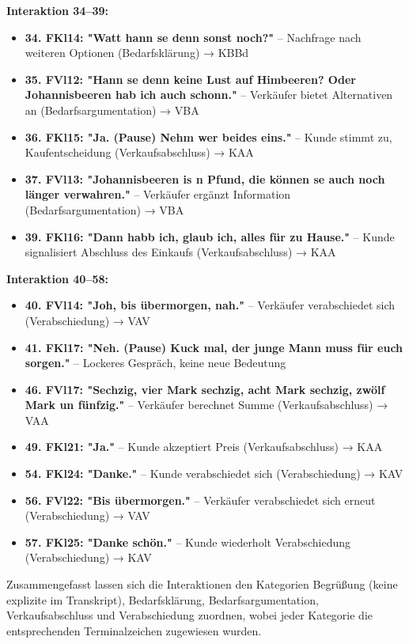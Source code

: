 \documentclass[
]{article}
\begin{document}
\textbf{Interaktion 34--39:}

\begin{itemize}
\item
  \textbf{34. FKl14: "Watt hann se denn sonst noch?"} -- Nachfrage nach weiteren Optionen (Bedarfsklärung) → KBBd
\item
  \textbf{35. FVl12: "Hann se denn keine Lust auf Himbeeren? Oder Johannisbeeren hab ich auch schonn."} -- Verkäufer bietet Alternativen an (Bedarfsargumentation) → VBA
\item
  \textbf{36. FKl15: "Ja. (Pause) Nehm wer beides eins."} -- Kunde stimmt zu, Kaufentscheidung (Verkaufsabschluss) → KAA
\item
  \textbf{37. FVl13: "Johannisbeeren is \textquotesingle n Pfund, die können se auch noch länger verwahren."} -- Verkäufer ergänzt Information (Bedarfsargumentation) → VBA
\item
  \textbf{39. FKl16: "Dann habb ich, glaub ich, alles für zu Hause."} -- Kunde signalisiert Abschluss des Einkaufs (Verkaufsabschluss) → KAA
\end{itemize}

\textbf{Interaktion 40--58:}

\begin{itemize}
\item
  \textbf{40. FVl14: "Joh, bis übermorgen, nah."} -- Verkäufer verabschiedet sich (Verabschiedung) → VAV
\item
  \textbf{41. FKl17: "Neh. (Pause) Kuck mal, der junge Mann muss für euch sorgen."} -- Lockeres Gespräch, keine neue Bedeutung
\item
  \textbf{46. FVl17: "Sechzig, vier Mark sechzig, acht Mark sechzig, zwölf Mark un fünfzig."} -- Verkäufer berechnet Summe (Verkaufsabschluss) → VAA
\item
  \textbf{49. FKl21: "Ja."} -- Kunde akzeptiert Preis (Verkaufsabschluss) → KAA
\item
  \textbf{54. FKl24: "Danke."} -- Kunde verabschiedet sich (Verabschiedung) → KAV
\item
  \textbf{56. FVl22: "Bis übermorgen."} -- Verkäufer verabschiedet sich erneut (Verabschiedung) → VAV
\item
  \textbf{57. FKl25: "Danke schön."} -- Kunde wiederholt Verabschiedung (Verabschiedung) → KAV
\end{itemize}

Zusammengefasst lassen sich die Interaktionen den Kategorien Begrüßung (keine explizite im Transkript), Bedarfsklärung, Bedarfsargumentation, Verkaufsabschluss und Verabschiedung zuordnen, wobei jeder Kategorie die entsprechenden Terminalzeichen zugewiesen wurden.
\end{document}
